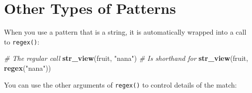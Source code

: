 \documentclass[
]{book}
\newenvironment{Shaded}{\begin{snugshade}}{\end{snugshade}}
\newcommand{\CommentTok}[1]{\textcolor[rgb]{0.56,0.35,0.01}{\textit{#1}}}
\newcommand{\KeywordTok}[1]{\textcolor[rgb]{0.13,0.29,0.53}{\textbf{#1}}}
\newcommand{\NormalTok}[1]{#1}
\newcommand{\StringTok}[1]{\textcolor[rgb]{0.31,0.60,0.02}{#1}}
\begin{document}
\hypertarget{other-types-of-patterns}{%
\section{Other Types of Patterns}\label{other-types-of-patterns}}

When you use a pattern that is a string, it is automatically wrapped into a call to \texttt{regex()}:

\begin{Shaded}
\begin{Highlighting}[]
\CommentTok{# The regular call}
\KeywordTok{str_view}\NormalTok{(fruit, }\StringTok{"nana"}\NormalTok{)}
\CommentTok{# Is shorthand for}
\KeywordTok{str_view}\NormalTok{(fruit, }\KeywordTok{regex}\NormalTok{(}\StringTok{"nana"}\NormalTok{))}
\end{Highlighting}
\end{Shaded}

You can use the other arguments of \texttt{regex()} to control details of the match:
\end{document}
